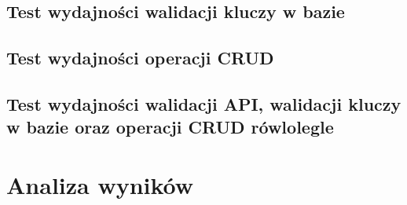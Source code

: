 \subsection{Test wydajności walidacji kluczy w bazie}


\subsection{Test wydajności operacji CRUD}


\subsection{Test wydajności walidacji API, walidacji kluczy w bazie oraz operacji CRUD rówlolegle }


\newpage
\section{Analiza wyników}
